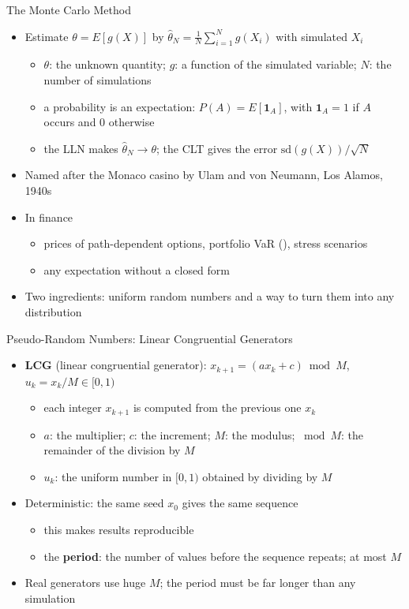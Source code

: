 \begin{frame}{The Monte Carlo Method}
\itemsize{\footnotesize}
\begin{itemize}
    \item Estimate $\theta = E[g(X)]$ by $\hat\theta_N = \frac1N\sum_{i=1}^N g(X_i)$ with simulated $X_i$
    \begin{itemize}
        \item $\theta$: the unknown quantity; $g$: a function of the simulated variable; $N$: the number of simulations
        \item a probability is an expectation: $P(A) = E[\mathbf{1}_A]$, with $\mathbf{1}_A = 1$ if $A$ occurs and 0 otherwise
        \item the LLN makes $\hat\theta_N \to \theta$; the CLT gives the error $\text{sd}(g(X))/\sqrt{N}$
    \end{itemize}
    \item Named after the Monaco casino by Ulam and von Neumann, Los Alamos, 1940s 
    \item In finance 
    \begin{itemize}
        \item prices of path-dependent options, portfolio VaR (), stress scenarios
        \item any expectation without a closed form
    \end{itemize}
    \item Two ingredients: uniform random numbers and a way to turn them into any distribution
\end{itemize}
\end{frame}

\begin{frame}{Pseudo-Random Numbers: Linear Congruential Generators}
\itemsize{\small}
\begin{itemize}
    \item \textbf{LCG} (linear congruential generator): $x_{k+1} = (a x_k + c) \bmod M$, $u_k = x_k/M \in [0, 1)$
    \begin{itemize}
        \item each integer $x_{k+1}$ is computed from the previous one $x_k$
        \item $a$: the multiplier; $c$: the increment; $M$: the modulus; $\bmod M$: the remainder of the division by $M$
        \item $u_k$: the uniform number in $[0, 1)$ obtained by dividing by $M$
    \end{itemize}
    \item Deterministic: the same seed $x_0$ gives the same sequence
    \begin{itemize}
        \item this makes results reproducible
        \item the \textbf{period}: the number of values before the sequence repeats; at most $M$
    \end{itemize}
    \item Real generators use huge $M$; the period must be far longer than any simulation
\end{itemize}
\end{frame}

